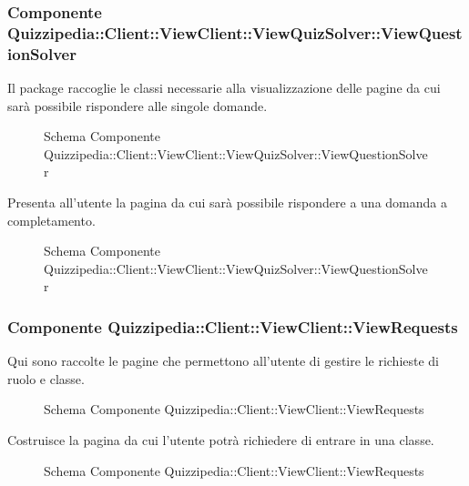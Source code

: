 \subsubsection{Componente Quizzipedia::Client::ViewClient::ViewQuizSolver::ViewQuestionSolver}
Il package raccoglie le classi necessarie alla visualizzazione delle pagine da cui sarà possibile rispondere alle singole domande.
\begin{figure}[H]
\centering
\noindent{}
\caption{Schema Componente Quizzipedia::Client::ViewClient::ViewQuizSolver::ViewQuestionSolver}
\end{figure}
Presenta all'utente la pagina da cui sarà possibile rispondere a una domanda a completamento.
\begin{figure}[H]
\centering
\noindent{}
\caption{Schema Componente Quizzipedia::Client::ViewClient::ViewQuizSolver::ViewQuestionSolver}
\end{figure}
\subsubsection{Componente Quizzipedia::Client::ViewClient::ViewRequests}
Qui sono raccolte le pagine che permettono all'utente di gestire le richieste di ruolo e classe.
\begin{figure}[H]
\centering
\noindent{}
\caption{Schema Componente Quizzipedia::Client::ViewClient::ViewRequests}
\end{figure}
Costruisce la pagina da cui l'utente potrà richiedere di entrare in una classe.
\begin{figure}[H]
\centering
\noindent{}
\caption{Schema Componente Quizzipedia::Client::ViewClient::ViewRequests}
\end{figure}
